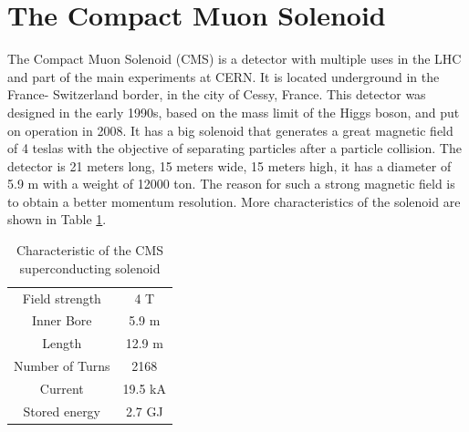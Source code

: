 \section{The Compact Muon Solenoid}	
The Compact Muon Solenoid (CMS) is a detector with multiple uses in the LHC and part of the main experiments at CERN. It is located underground in the France- Switzerland border, in the city of Cessy, France.
This detector was designed in the early 1990s, based on the mass limit of the Higgs boson, and put on operation in 2008. It has a big solenoid that generates a great magnetic field of 4 teslas with the objective of separating particles after a particle collision.
 The detector is 21 meters long, 15 meters wide, 15 meters high, it has a diameter of 5.9 m with a weight of 12000 ton. The reason for such a strong magnetic field is to obtain a better momentum resolution. More characteristics of the solenoid are shown in Table \ref{tab:my_label}.  
 \begin{table}[ht]
 	\caption[Characteristic of the CMS superconducting solenoid]{Characteristic of the CMS superconducting solenoid\cite{cms-manual}}
 	\centering
 	\begin{tabular}{|c|c|}
 		\hline
 		Field strength & 4 T \\
 		Inner Bore & 5.9 m \\
 		Length & 12.9 m\\
 		Number of Turns & 2168\\
 		Current & 19.5 kA\\
 		Stored energy & 2.7 GJ\\
 		\hline
 	\end{tabular}
 	\label{tab:my_label}
 \end{table}
 
